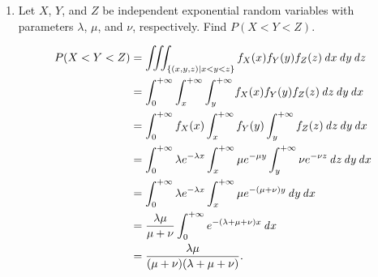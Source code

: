\begin{enumerate}
\item Let \(X\), \(Y\), and \(Z\) be independent exponential random
  variables with parameters \(λ\), \(μ\), and \(ν\), respectively.  Find
  \(P(X < Y < Z)\).

  \begin{align*}
    P(X < Y < Z) &= \iiint_{\{(x,y,z) \mid x < y <z\}} f_X(x) f_Y(y) f_Z(z) \dx \dy \dz \\
                 &= \int_0^{+\infty} \int_x^{+\infty} \int_y^{+\infty} f_X(x) f_Y(y) f_Z(z) \dz \dy \dx \\
                 &= \int_0^{+\infty} f_X(x) \int_x^{+\infty} f_Y(y) \int_y^{+\infty} f_Z(z) \dz \dy \dx \\
                 &= \int_0^{+\infty} \lambda e^{-\lambda x} \int_x^{+\infty} \mu e^{-\mu y} \int_y^{+\infty} \nu e^{-\nu z} \dz \dy \dx \\
                 &= \int_0^{+\infty} \lambda e^{-\lambda x} \int_x^{+\infty} \mu e^{-(\mu+\nu)y} \dy \dx \\
                 &= \frac{\lambda \mu}{\mu + \nu} \int_0^{+\infty} e^{-(\lambda + \mu + \nu)x} \dx \\
                 &= \frac{\lambda \mu}{(\mu + \nu)(\lambda + \mu + \nu)}.
  \end{align*}
\end{enumerate}

